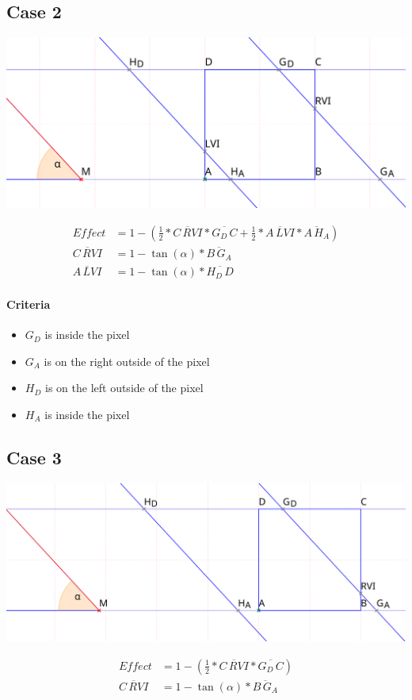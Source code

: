 \documentclass[a4paper,10pt,fleqn]{scrartcl}
\numberwithin{equation}{subsection}
\begin{document}
\subsection{Case 2}
\begin{minipage}{\textwidth}
\includegraphics[width=\textwidth]{case2}
\end{minipage}
\begin{align}
Effect &= 1 - (\frac{1}{2} * \overline{C\,RVI} * \overline{G_D\,C} + \frac{1}{2} * \overline{A\,LVI} * \overline{A\,H_A})\\
\overline{C\,RVI} &=  1 - \tan(\alpha) * \overline{B\,G_A}\\
\overline{A\,LVI} &=  1 - \tan(\alpha) * \overline{H_D\,D}
\end{align}
\paragraph{Criteria}
\begin{itemize}
 \item $G_D$ is inside the pixel
 \item $G_A$ is on the right outside of the pixel
 \item $H_D$ is on the left outside of the pixel
 \item $H_A$ is inside the pixel
\end{itemize}
%
\subsection{Case 3}
\begin{minipage}{\textwidth}
\includegraphics[width=\textwidth]{case3}
\end{minipage}
\begin{align}
Effect &= 1 - (\frac{1}{2} * \overline{C\,RVI} * \overline{G_D\,C})\\
\overline{C\,RVI} &=  1 - \tan(\alpha) * \overline{B\,G_A}
\end{align}
\end{document}
